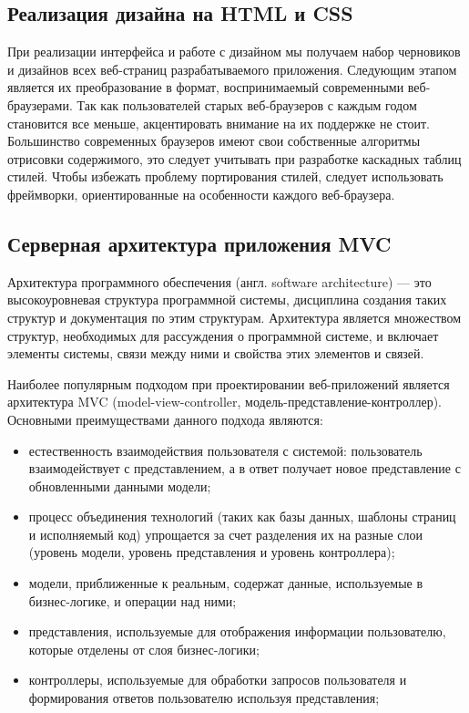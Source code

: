 
\subsection{Реализация дизайна на HTML и CSS}
\label{sub:domain:learning_structure}
При реализации интерфейса и работе с дизайном мы получаем набор черновиков и дизайнов всех веб-страниц разрабатываемого приложения. Следующим этапом является их преобразование в формат, воспринимаемый современными веб-браузерами. Так как пользователей старых веб-браузеров с каждым годом становится все меньше, акцентировать внимание на их поддержке не стоит. Большинство современных браузеров имеют свои собственные алгоритмы отрисовки содержимого, это следует учитывать при разработке каскадных таблиц стилей. Чтобы избежать проблему портирования стилей, следует использовать фреймворки, ориентированные на особенности каждого веб-браузера.


\subsection{Серверная архитектура приложения MVC}
\label{sub:domain:manual_structure}
Архитектура программного обеспечения (англ. software architecture) — это высокоуровневая структура программной системы, дисциплина создания таких структур и документация по этим структурам. Архитектура является множеством структур, необходимых для рассуждения о программной системе, и включает элементы системы, связи между ними и свойства этих элементов и связей.

Наиболее популярным подходом при проектировании веб-приложений является архитектура MVC (model-view-controller, модель-представление-контроллер). Основными преимуществами данного подхода являются:

\begin{itemize}
  \item естественность взаимодействия пользователя с системой: пользователь взаимодействует с представлением, а в ответ получает новое представление с обновленными данными модели;
  \item процесс объединения технологий (таких как базы данных, шаблоны страниц и исполняемый код) упрощается за счет разделения их на разные слои (уровень модели, уровень представления и уровень контроллера);
  \item модели, приближенные к реальным, содержат данные, используемые в бизнес-логике, и операции над ними;
  \item представления, используемые для отображения информации пользователю, которые отделены от слоя бизнес-логики;
  \item контроллеры, используемые для обработки запросов пользователя и формирования ответов пользователю используя представления;
\end{itemize}

